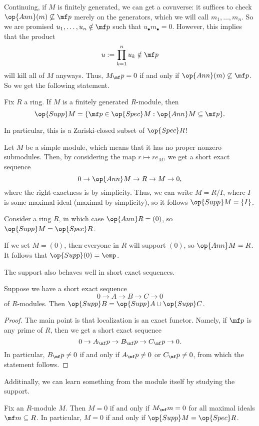 Continuing, if $M$ is finitely generated, we can get a covnverse: it suffices to check $\op{Ann}(m)\not\subseteq\mf p$ merely on the generators, which we will call $m_1,\ldots,m_n$. So we are promised $u_1,\ldots,u_n\notin\mf p$ such that $u_\bullet m_\bullet=0$. However, this implies that the product
\[u:=\prod_{k=1}^nu_k\notin\mf p\]
will kill all of $M$ anyways. Thus, $M_\mf p=0$ if and only if $\op{Ann}(m)\not\subseteq\mf p$. So we get the following statement.
\begin{proposition}
	Fix $R$ a ring. If $M$ is a finitely generated $R$-module, then
	\[\op{Supp}M=\{\mf p\in\op{Spec}M:\op{Ann}M\subseteq\mf p\}.\]
\end{proposition}
In particular, this is a Zariski-closed subset of $\op{Spec}R$!
\begin{example}
	Let $M$ be a simple module, which means that it has no proper nonzero submodules. Then, by considering the map $r\mapsto re_M$, we get a short exact sequence
	\[0\to\op{Ann}M\to R\to M\to 0,\]
	where the right-exactness is by simplicity. Thus, we can write $M=R/I$, where $I$ is some maximal ideal (maximal by simplicity), so it follows $\op{Supp}M=\{I\}$.
\end{example}
\begin{example}
	Consider a ring $R$, in which case $\op{Ann}R=(0)$, so $\op{Supp}M=\op{Spec}R$.
\end{example}
\begin{example}
	If we set $M=(0)$, then everyone in $R$ will support $(0)$, so $\op{Ann}M=R$. It follows that $\op{Supp}(0)=\emp$.
\end{example}
The support also behaves well in short exact sequences.
\begin{proposition}
	Suppose we have a short exact sequence
	\[0\to A\to B\to C\to 0\]
	of $R$-modules. Then $\op{Supp}B=\op{Supp}A\cup\op{Supp}C$.
\end{proposition}
\begin{proof}
	The main point is that localization is an exact functor. Namely, if $\mf p$ is any prime of $R$, then we get a short exact sequence
	\[0\to A_\mf p\to B_\mf p\to C_\mf p\to0.\]
	In particular, $B_\mf p\ne0$ if and only if $A_\mf p\ne0$ or $C_\mf p\ne0$, from which the statement follows.
\end{proof}
Additinally, we can learn something from the module itself by studying the support.
\begin{proposition}
	Fix an $R$-module $M$. Then $M=0$ if and only if $M_\mf m=0$ for all maximal ideals $\mf m\subseteq R$. In particular, $M=0$ if and only if $\op{Supp}M=\op{Spec}R$.
\end{proposition}
